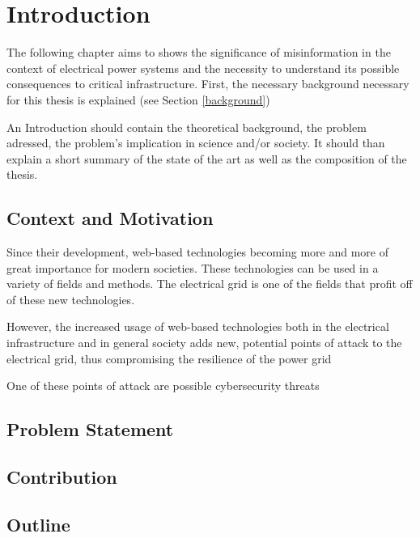 \chapter{Introduction}

The following chapter aims to
shows the significance of misinformation in the context of
electrical power systems and the necessity to understand its
possible consequences to critical infrastructure. 
First, the necessary background necessary for this thesis is explained
(see Section \ref{background})

An Introduction should contain the theoretical background, 
the problem adressed, the problem's implication in science and/or society. 
It should than explain a short summary of the state of the art  as well 
as the composition of the thesis.

\section{Context and Motivation}
Since their development, web-based technologies 
becoming more and more of great importance for modern societies.
These technologies can be used in a variety of fields and methods.
The electrical grid is one of the fields that profit off of these new 
technologies. 

However, the increased usage of web-based technologies both in the 
electrical infrastructure and in general society adds new, potential points
of attack to the electrical grid, thus compromising the resilience of the 
power grid

One of these points of attack are possible cybersecurity threats
\section{Problem Statement}
\section{Contribution}
\section{Outline}